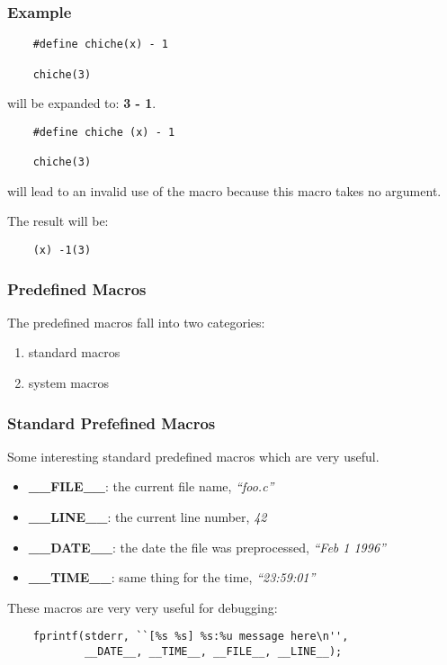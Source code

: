 \documentclass[8pt]{beamer}
\newcommand{\nl}[0]{\vspace{0.4cm}}
\begin{document}

\begin{frame}[containsverbatim]
  \frametitle{Example}

  \begin{verbatim}
    #define chiche(x) - 1

    chiche(3)
  \end{verbatim}

  will be expanded to: \textbf{3 - 1}.

  \begin{verbatim}
    #define chiche (x) - 1

    chiche(3)
  \end{verbatim}

  will lead to an invalid use of the macro because this macro takes no
  argument.

  \nl

  The result will be:

  \begin{verbatim}
    (x) -1(3)
  \end{verbatim}
\end{frame}


\begin{frame}
  \frametitle{Predefined Macros}

  The predefined macros fall into two categories:

  \begin{enumerate}
    \item
      standard macros
    \item
      system macros
  \end{enumerate}
\end{frame}


\begin{frame}[containsverbatim]
  \frametitle{Standard Prefefined Macros}

  Some interesting standard predefined macros which are very useful.

  \begin{itemize}
    \item
      \textbf{\_\_FILE\_\_}: the current file name, \textit{``foo.c''}
    \item
      \textbf{\_\_LINE\_\_}: the current line number, \textit{42}
    \item
      \textbf{\_\_DATE\_\_}: the date the file was preprocessed,
      \textit{``Feb 1 1996''}
    \item
      \textbf{\_\_TIME\_\_}: same thing for the time, \textit{``23:59:01''}
  \end{itemize}

  These macros are very very useful for debugging:

  \begin{verbatim}
    fprintf(stderr, ``[%s %s] %s:%u message here\n'', 
            __DATE__, __TIME__, __FILE__, __LINE__);
  \end{verbatim}
\end{frame}
\end{document}
